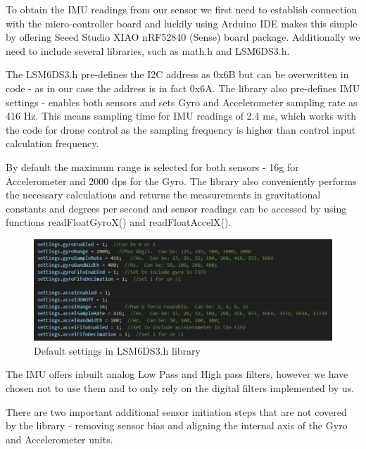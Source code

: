 \begin{flushleft}
To obtain the IMU readings from our sensor we first need to establish connection with the micro-controller board and luckily using Arduino IDE makes this simple by offering Seeed Studio XIAO nRF52840 (Sense) board package. Additionally we need to include several libraries, such as math.h and LSM6DS3.h. 

The LSM6DS3.h pre-defines the I2C address as 0x6B but can be overwritten in code - as in our case the address is in fact 0x6A. 
The library also pre-defines IMU settings - enables both sensors and sets Gyro and Accelerometer sampling rate as 416 Hz. This means sampling time for IMU readings of 2.4 ms, which works with the code for drone control as the sampling frequency is higher than control input calculation frequency. 

By default the maximum range is selected for both sensors - 16g for Accelerometer and 2000 dps for the Gyro. The library also conveniently performs the necessary calculations and returns the measurements in gravitational constants and degrees per second and sensor readings can be accessed by using functions readFloatGyroX() and readFloatAccelX().  

\begin{figure}[H]
    \begin{center}
    \includegraphics[scale = 0.55]{pictures/IMU/Library_settings.png}
    \end{center}
    \caption{Default settings in LSM6DS3.h library}
    \label{fig:my_label}
\end{figure}

\begin{flushleft}
The IMU offers inbuilt analog Low Pass and High pass filters, however we have chosen not to use them and to only rely on the digital filters implemented by us.

There are two important additional sensor initiation steps that are not covered by the library - removing sensor bias and aligning the internal axis of the Gyro and Accelerometer units. 


\end{flushleft}
\end{flushleft}
